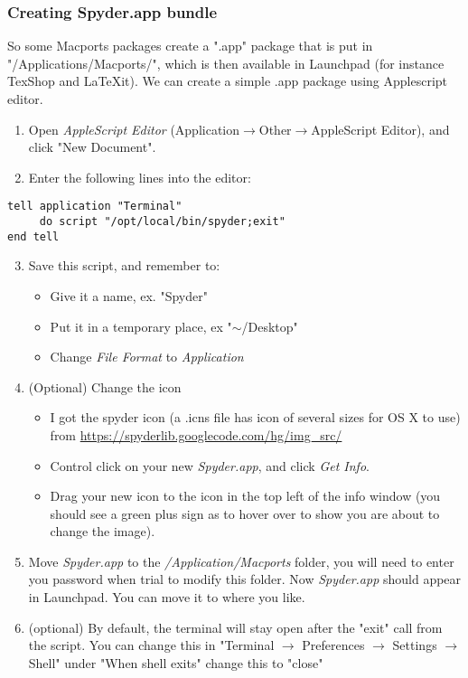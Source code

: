 \documentclass[11pt]{article}
\begin{document}
\subsubsection{Creating Spyder.app bundle}
So some Macports packages create a ".app" package that is put in "/Applications/Macports/", which is then available in Launchpad (for instance TexShop and LaTeXit). We can create a simple .app package using Applescript editor.
\begin{enumerate}
	\item Open {\it AppleScript Editor} (Application$\rightarrow$Other$\rightarrow$AppleScript Editor), and click "New Document".
	\item Enter the following lines into the editor:
\end{enumerate}
\begin{lstlisting}[style=Bash]
tell application "Terminal"
     do script "/opt/local/bin/spyder;exit"
end tell
\end{lstlisting}
\begin{enumerate}
	\setcounter{enumi}{2}
	\item Save this script, and remember to:
	\begin{itemize} 
		\item Give it a name, ex. "Spyder"
		\item Put it in a temporary place, ex "$\sim$/Desktop"
		\item Change {\it File Format} to {\it Application}
	\end{itemize}
	\item (Optional) Change the icon
	\begin{itemize}
		\item I got the spyder icon (a {.icns} file has icon of several sizes for OS X to use) from \url{https://spyderlib.googlecode.com/hg/img_src/}
		\item Control click on your new {\it Spyder.app}, and click {\it Get Info}.
		\item Drag your new icon to the icon in the top left of the info window (you should see a green plus sign as to hover over to show you are about to change the image).
	\end{itemize}
	\item Move {\it Spyder.app} to the {\it /Application/Macports} folder, you will need to enter you password when trial to modify this folder. Now {\it Spyder.app} should appear in Launchpad. You can move it to where you like.
	\item (optional) By default, the terminal will stay open after the "exit" call from the script. You can change this in "Terminal $\rightarrow$ Preferences $\rightarrow$ Settings $\rightarrow$ Shell" under "When shell exits" change this to "close"
\end{enumerate}
\end{document}
